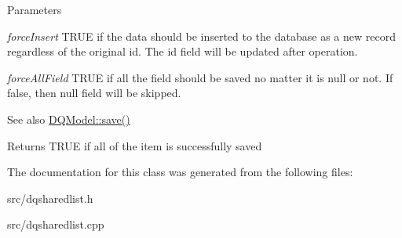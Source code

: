 \begin{DoxyParams}{Parameters}
\item[{\em forceInsert}]TRUE if the data should be inserted to the database as a new record regardless of the original id. The id field will be updated after operation. \item[{\em forceAllField}]TRUE if all the field should be saved no matter it is null or not. If false, then null field will be skipped. \end{DoxyParams}
\begin{DoxySeeAlso}{See also}
\hyperlink{classDQModel_a6807b1e090625800c949662485fd4fea}{DQModel::save()}
\end{DoxySeeAlso}
\begin{DoxyReturn}{Returns}
TRUE if all of the item is successfully saved 
\end{DoxyReturn}


The documentation for this class was generated from the following files:\begin{DoxyCompactItemize}
\item 
src/dqsharedlist.h\item 
src/dqsharedlist.cpp\end{DoxyCompactItemize}
